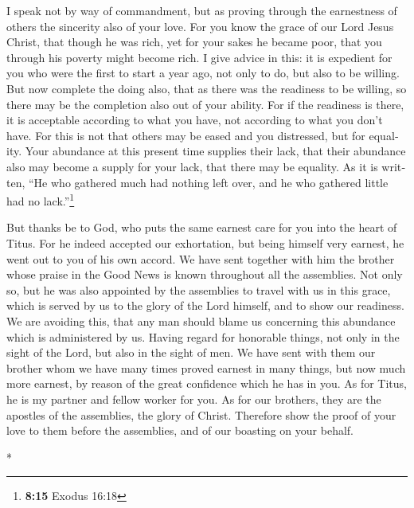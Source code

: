 \begin{paracol}{2}
\begin{otherlanguage}{english}
 I speak not by way of commandment, but as proving through
the earnestness of others the sincerity also of your love.
 For you know the grace of our Lord Jesus Christ, that
though he was rich, yet for your sakes he became poor, that you through
his poverty might become rich.  I give advice in this: it
is expedient for you who were the first to start a year ago, not only to
do, but also to be willing.  But now complete the doing
also, that as there was the readiness to be willing, so there may be the
completion also out of your ability.  For if the
readiness is there, it is acceptable according to what you have, not
according to what you don't have.  For this is not that
others may be eased and you distressed,  but for
equality. Your abundance at this present time supplies their lack, that
their abundance also may become a supply for your lack, that there may
be equality.  As it is written, ``He who gathered much
had nothing left over, and he who gathered little had no
lack.''\footnote{\textbf{8:15} Exodus 16:18}

 But thanks be to God, who puts the same earnest care for
you into the heart of Titus.  For he indeed accepted our
exhortation, but being himself very earnest, he went out to you of his
own accord.  We have sent together with him the brother
whose praise in the Good News is known throughout all the assemblies.
 Not only so, but he was also appointed by the assemblies
to travel with us in this grace, which is served by us to the glory of
the Lord himself, and to show our readiness.  We are
avoiding this, that any man should blame us concerning this abundance
which is administered by us.  Having regard for honorable
things, not only in the sight of the Lord, but also in the sight of men.
 We have sent with them our brother whom we have many
times proved earnest in many things, but now much more earnest, by
reason of the great confidence which he has in you.  As
for Titus, he is my partner and fellow worker for you. As for our
brothers, they are the apostles of the assemblies, the glory of Christ.
 Therefore show the proof of your love to them before the
assemblies, and of our boasting on your behalf.

\end{otherlanguage}

\switchcolumn[0]*


\end{paracol}
